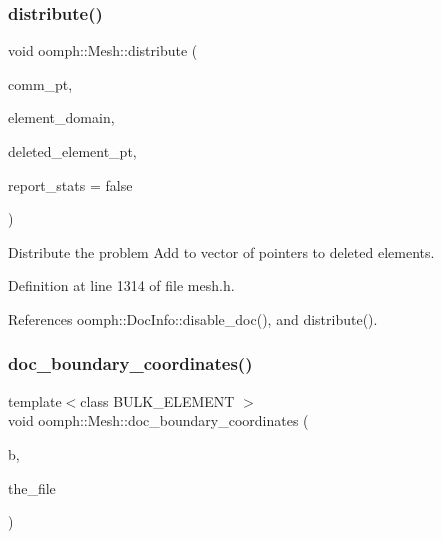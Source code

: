 \mbox{\label{classoomph_1_1Mesh_a584afe5d5e1a1fcff57973041492b073}} 
\subsubsection{\texorpdfstring{distribute()}{distribute()}\hspace{0.1cm}{\footnotesize\ttfamily [2/2]}}
{\footnotesize\ttfamily void oomph\+::\+Mesh\+::distribute (\begin{DoxyParamCaption}\item[{\hyperlink{classoomph_1_1OomphCommunicator}{Oomph\+Communicator} $\ast$}]{comm\+\_\+pt,  }\item[{const \hyperlink{classoomph_1_1Vector}{Vector}$<$ unsigned $>$ \&}]{element\+\_\+domain,  }\item[{\hyperlink{classoomph_1_1Vector}{Vector}$<$ \hyperlink{classoomph_1_1GeneralisedElement}{Generalised\+Element} $\ast$$>$ \&}]{deleted\+\_\+element\+\_\+pt,  }\item[{const bool \&}]{report\+\_\+stats = {\ttfamily false} }\end{DoxyParamCaption})\hspace{0.3cm}{\ttfamily [inline]}}



Distribute the problem Add to vector of pointers to deleted elements. 



Definition at line 1314 of file mesh.\+h.



References oomph\+::\+Doc\+Info\+::disable\+\_\+doc(), and distribute().

\mbox{\label{classoomph_1_1Mesh_a68cad622b3fe39d306fe367d0fdf4083}} 
\subsubsection{\texorpdfstring{doc\+\_\+boundary\+\_\+coordinates()}{doc\_boundary\_coordinates()}}
{\footnotesize\ttfamily template$<$class B\+U\+L\+K\+\_\+\+E\+L\+E\+M\+E\+NT $>$ \\
void oomph\+::\+Mesh\+::doc\+\_\+boundary\+\_\+coordinates (\begin{DoxyParamCaption}\item[{const unsigned \&}]{b,  }\item[{std\+::ofstream \&}]{the\+\_\+file }\end{DoxyParamCaption})\hspace{0.3cm}{\ttfamily [inline]}}



